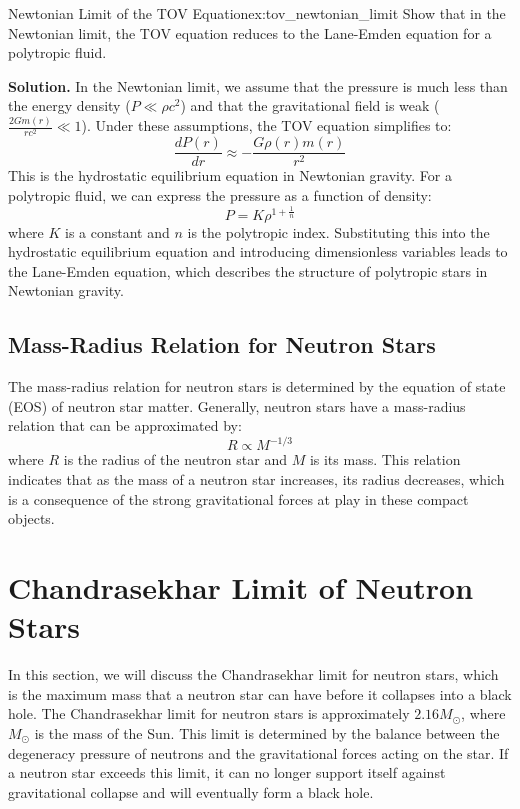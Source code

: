 \begin{example}{Newtonian Limit of the TOV Equation}{ex:tov_newtonian_limit}
Show that in the Newtonian limit, the TOV equation reduces to the Lane-Emden equation for a polytropic fluid.

\smallskip\textbf{Solution.} In the Newtonian limit, we assume that the pressure is much less than the energy density ($P \ll \rho c^2$) and that the gravitational field is weak ($\frac{2Gm(r)}{rc^2} \ll 1$). Under these assumptions, the TOV equation simplifies to:
\begin{equation}
\frac{dP(r)}{dr} \approx -\frac{G \rho(r) m(r)}{r^2}
\end{equation}
This is the hydrostatic equilibrium equation in Newtonian gravity. For a polytropic fluid, we can express the pressure as a function of density:
\begin{equation}
P = K \rho^{1 + \frac{1}{n}}
\end{equation}
where $K$ is a constant and $n$ is the polytropic index. Substituting this into the hydrostatic equilibrium equation and introducing dimensionless variables leads to the Lane-Emden equation, which describes the structure of polytropic stars in Newtonian gravity.  
\end{example}

\subsection{Mass-Radius Relation for Neutron Stars}
\begin{theory}
The mass-radius relation for neutron stars is determined by the equation of state (EOS) of neutron star matter. Generally, neutron stars have a mass-radius relation that can be approximated by:
\begin{equation}
R \propto M^{-1/3}
\end{equation}
where $R$ is the radius of the neutron star and $M$ is its mass. This relation indicates that as the mass of a neutron star increases, its radius decreases, which is a consequence of the strong gravitational forces at play in these compact objects.
\end{theory}

\section{Chandrasekhar Limit of Neutron Stars}
In this section, we will discuss the Chandrasekhar limit for neutron stars, which is the maximum mass that a neutron star can have before it collapses into a black hole. 
The Chandrasekhar limit for neutron stars is approximately $2.16 M_\odot$, where $M_\odot$ is the mass of the Sun. This limit is determined by the balance between the degeneracy pressure of neutrons and the gravitational forces acting on the star. 
If a neutron star exceeds this limit, it can no longer support itself against gravitational collapse and will eventually form a black hole.

